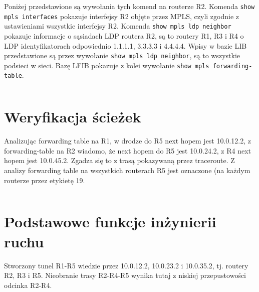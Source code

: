 \documentclass[a4paper,12pt,notitlepage]{article}
\begin{document}
Poniżej przedstawione są wywołania tych komend na routerze R2. Komenda \texttt{show mpls interfaces} pokazuje interfejsy R2 objęte przez MPLS, czyli zgodnie z ustawieniami wszystkie interfejsy R2. Komenda \texttt{show mpls ldp neighbor} pokazuje informacje o sąsiadach LDP routera R2, są to routery R1, R3 i R4 o LDP identyfikatorach odpowiednio 1.1.1.1, 3.3.3.3 i 4.4.4.4. Wpisy w bazie LIB przedstawione są przez wywołanie \texttt{show mpls ldp neighbor}, są to wszystkie podsieci w sieci. Bazę LFIB pokazuje z kolei wywołanie \texttt{show mpls forwarding-table}.
\inputminted[label=Weryfikacja MPLS/LDP na R2, firstline=204, lastline=307]{text}{R/R2.txt}

\section{Weryfikacja ścieżek}

Analizując forwarding table na R1, w drodze do R5 next hopem jest 10.0.12.2, z forwarding-table na R2 wiadomo, że next hopem do R5 jest 10.0.24.2, z R4 next hopem jest 10.0.45.2. Zgadza się to z trasą pokazywaną przez traceroute. Z analizy forwarding table na wszystkich routerach R5 jest oznaczone (na każdym routerze przez etykietę 19.
\inputminted[label=Forwarding table R1, firstline=253, lastline=272]{text}{R/R1.txt}

\section{Podstawowe funkcje inżynierii ruchu}

Stworzony tunel R1-R5 wiedzie przez 10.0.12.2, 10.0.23.2 i 10.0.35.2, tj. routery R2, R3 i R5. Nieobranie trasy R2-R4-R5 wynika tutaj z niskiej przepustowości odcinka R2-R4.
\inputminted[label=MPLS tunel R1-R5, firstline=309, lastline=357]{text}{R/R1.txt}
\end{document}
